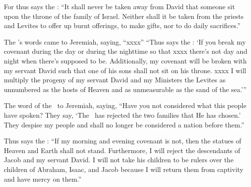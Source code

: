 \begin{inparaenum}
   For thus says the \lord: ``It shall never be taken away from David that someone sit upon the throne of the family of Israel.%
   Neither shall it be taken from the priests and Levites to offer up burnt offerings, to make gifts, nor to do daily sacrifices.''%

   The \lord's words came to Jeremiah, saying, ``xxxx''%
   ``Thus says the \lord: `If you break my covenant during the day or during the nighttime so that xxxx there's not day and night when there's supposed to be.%
   Additionally, my covenant will be broken with my servant David such that one of his sons shall not sit on his throne. xxxx%
   I will multiply the progeny of my servant David and my Ministers the Levites as unnumbered as the hosts of Heaven and as unmeasurable as the sand of the sea.'\thinspace''%

   The word of the \lord\ to Jeremiah, saying,%
   ``Have you not considered what this people have spoken? They say, `The \lord\ has rejected the two families that He has chosen.' They despise my people and shall no longer be considered a nation before them.''%

   Thus says the \lord: ``If my morning and evening covenant is not, then the statues of Heaven and Earth shall not stand.%
   Furthermore, I will reject the descendants of Jacob and my servant David. I will not take his children to be rulers over the children of Abraham, Isaac, and Jacob because I will return them from captivity and have mercy on them.''%
\end{inparaenum}

